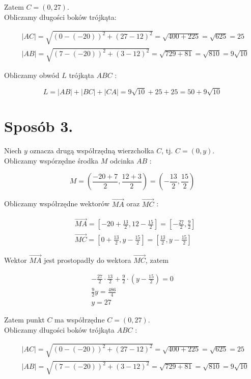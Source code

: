 \documentclass[10pt]{article}
\begin{document}
Zatem $C=(0,27)$.\\
Obliczamy długości boków trójkąta:

$$
\begin{aligned}
& |A C|=\sqrt{(0-(-20))^{2}+(27-12)^{2}}=\sqrt{400+225}=\sqrt{625}=25 \\
& |A B|=\sqrt{(7-(-20))^{2}+(3-12)^{2}}=\sqrt{729+81}=\sqrt{810}=9 \sqrt{10}
\end{aligned}
$$

Obliczamy obwód $L$ trójkąta $A B C$ :

$$
L=|A B|+|B C|+|C A|=9 \sqrt{10}+25+25=50+9 \sqrt{10}
$$

\section*{Sposób 3.}
Niech $y$ oznacza drugą współrzędną wierzchołka $C$, tj. $C=(0, y)$.\\
Obliczamy wspórzędne środka $M$ odcinka $A B$ :

$$
M=\left(\frac{-20+7}{2}, \frac{12+3}{2}\right)=\left(-\frac{13}{2}, \frac{15}{2}\right)
$$

Obliczamy współrzędne wektorów $\overrightarrow{M A}$ oraz $\overrightarrow{M C}$ :

$$
\begin{aligned}
& \overrightarrow{M A}=\left[-20+\frac{13}{2}, 12-\frac{15}{2}\right]=\left[-\frac{27}{2}, \frac{9}{2}\right] \\
& \overrightarrow{M C}=\left[0+\frac{13}{2}, y-\frac{15}{2}\right]=\left[\frac{13}{2}, y-\frac{15}{2}\right]
\end{aligned}
$$

Wektor $\overrightarrow{M A}$ jest prostopadły do wektora $\overrightarrow{M C}$, zatem

$$
\begin{gathered}
-\frac{27}{2} \cdot \frac{13}{2}+\frac{9}{2} \cdot\left(y-\frac{15}{2}\right)=0 \\
\frac{9}{2} y=\frac{486}{4} \\
y=27
\end{gathered}
$$

Zatem punkt $C$ ma współrzędne $C=(0,27)$.\\
Obliczamy długości boków trójkąta $A B C$ :

$$
\begin{aligned}
& |A C|=\sqrt{(0-(-20))^{2}+(27-12)^{2}}=\sqrt{400+225}=\sqrt{625}=25 \\
& |A B|=\sqrt{(7-(-20))^{2}+(3-12)^{2}}=\sqrt{729+81}=\sqrt{810}=9 \sqrt{10}
\end{aligned}
$$
\end{document}
